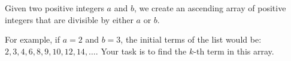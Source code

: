 Given two positive integers $a$ and $b$, we create an ascending array of positive integers that are divisible by either $a$ or $b$.

For example, if $a=2$ and $b=3$, the initial terms of the list would be: $2, 3, 4, 6, 8, 9, 10, 12, 14, \ldots$.
Your task is to find the $k$-th term in this array.